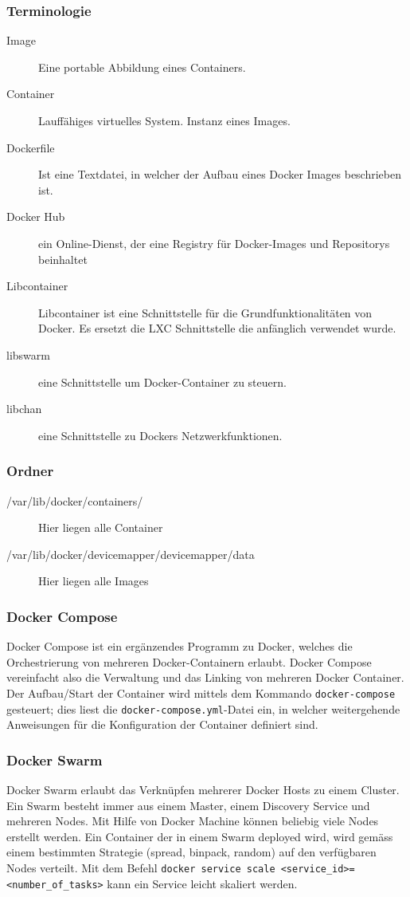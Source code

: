 \subsubsection{Terminologie}
\begin{description}
	\item[Image] Eine portable Abbildung eines Containers.
	\item[Container] Lauffähiges virtuelles System. Instanz eines Images.
	\item[Dockerfile] Ist eine Textdatei, in welcher der Aufbau eines Docker Images beschrieben ist.
	\item[Docker Hub] ein Online-Dienst, der eine Registry für Docker-Images und Repositorys beinhaltet
	\item[Libcontainer] Libcontainer ist eine Schnittstelle für die Grundfunktionalitäten von Docker. Es ersetzt die LXC Schnittstelle die anfänglich verwendet wurde. 
	\item[libswarm]eine Schnittstelle um Docker-Container zu steuern.
	\item[libchan] eine Schnittstelle zu Dockers Netzwerkfunktionen.
\end{description}

\subsubsection{Ordner}
\begin{description}
	\item[/var/lib/docker/containers/] Hier liegen alle Container
	\item[/var/lib/docker/devicemapper/devicemapper/data] Hier liegen alle Images
\end{description}

\subsubsection{Docker Compose}
Docker Compose ist ein ergänzendes Programm zu Docker, welches die Orchestrierung von mehreren Docker-Containern erlaubt. Docker Compose vereinfacht also die Verwaltung und das Linking von mehreren Docker Container. Der Aufbau/Start der Container wird mittels dem Kommando \lstinline|docker-compose| gesteuert; dies liest die \lstinline|docker-compose.yml|-Datei ein, in welcher weitergehende Anweisungen für die Konfiguration der Container definiert sind.

\subsubsection{Docker Swarm}
Docker Swarm erlaubt das Verknüpfen mehrerer Docker Hosts zu einem Cluster. Ein Swarm besteht immer aus einem Master, einem Discovery Service und mehreren Nodes. Mit Hilfe von Docker Machine können beliebig viele Nodes erstellt werden. Ein Container der in einem Swarm deployed wird, wird gemäss einem bestimmten Strategie (spread, binpack, random) auf den verfügbaren Nodes verteilt. Mit dem Befehl \lstinline[]|docker service scale <service_id>=<number_of_tasks>| kann ein Service leicht skaliert werden.

